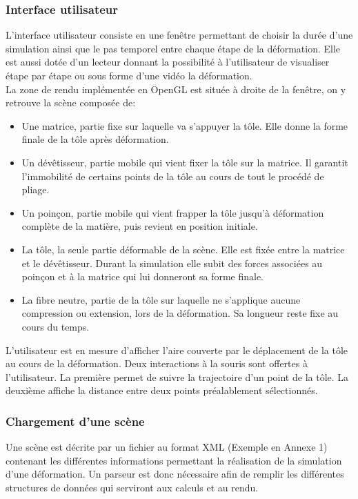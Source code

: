 \documentclass[a4paper, 11pt]{article}
\begin{document}
\subsubsection{Interface utilisateur}
L'interface utilisateur consiste en une fenêtre permettant de choisir la durée d'une simulation ainsi que le pas temporel entre chaque étape de la déformation.
Elle est aussi dotée d'un lecteur donnant la possibilité à l'utilisateur de visualiser étape par étape ou sous forme d'une vidéo la déformation.\\
La zone de rendu implémentée en OpenGL est située à droite de la fenêtre, on y retrouve la scène composée de:
\begin{itemize}
        \renewcommand{\labelitemi}{$\bullet$}
    \item Une matrice, partie fixe sur laquelle va s'appuyer la tôle.
        Elle donne la forme finale de la tôle après déformation.
    \item Un dévêtisseur, partie mobile qui vient fixer la tôle sur la matrice.
        Il garantit l'immobilité de certains points de la tôle au cours de tout le procédé de pliage.
    \item Un poinçon, partie mobile qui vient frapper la tôle jusqu'à déformation complète de la matière, puis revient en position initiale.
    \item La tôle, la seule partie déformable de la scène.
        Elle est fixée entre la matrice et le dévêtisseur.
        Durant la simulation elle subit des forces associées au poinçon et à la matrice qui lui donneront sa forme finale.
    \item La fibre neutre, partie de la tôle sur laquelle ne s'applique aucune compression ou extension, lors de la déformation.
        Sa longueur reste fixe au cours du temps.
\end{itemize}
L'utilisateur est en mesure d'afficher l'aire couverte par le déplacement de la tôle au cours de la déformation.
Deux interactions à la souris sont offertes à l'utilisateur.
La première permet de suivre la trajectoire d'un point de la tôle.
La deuxième affiche la distance entre deux points préalablement sélectionnés.

\subsubsection{Chargement d'une scène}
Une scène est décrite par un fichier au format XML (Exemple en Annexe 1) contenant les différentes informations permettant la réalisation de la simulation d'une déformation.
Un parseur est donc nécessaire afin de remplir les différentes structures de données qui serviront aux calculs et au rendu.
\end{document}
